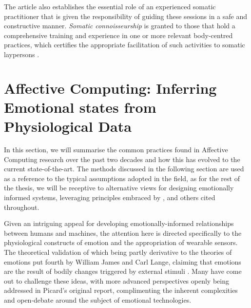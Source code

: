 The article also establishes the essential role of an experienced somatic practitioner that is given the responsibility of guiding these sessions in a safe and constructive manner. \textit{Somatic connoisseurship} is granted to those that hold a comprehensive training and experience in one or more relevant body-centred practices, which certifies the appropriate facilitation of such activities to somatic laypersons \cite{samaritter_aesthetic_2018}.

\section{Affective Computing: Inferring Emotional states from Physiological Data}
\label{alit_review:affective_computing}

In this section, we will summarise the common practices found in Affective Computing research over the past two decades and how this has evolved to the current state-of-the-art. The methods discussed in the following section are used as a reference to the typical assumptions adopted in the field, as for the rest of the thesis, we will be receptive to alternative views for designing emotionally informed systems, leveraging principles embraced by \citeauthor{hook_interactional_2008} \cite{hook_interactional_2008}, \citeauthor{barrett_functionalism_2017} \cite{barrett_functionalism_2017} and others cited throughout.

Given an intriguing appeal for developing emotionally-informed relationships between humans and machines, the attention here is directed specifically to the physiological constructs of emotion and the appropriation of wearable sensors. The theoretical validation of which being partly derivative to the theories of emotions put fourth by William James and Carl Lange, claiming that emotions are the result of bodily changes triggered by external stimuli \cite{james_principles_1890,cannon_james-lange_1927}. Many have come out to challenge these ideas, with more advanced perspectives openly being addressed in Picard's original report, complimenting the inherent complexities and open-debate around the subject of emotional technologies.


